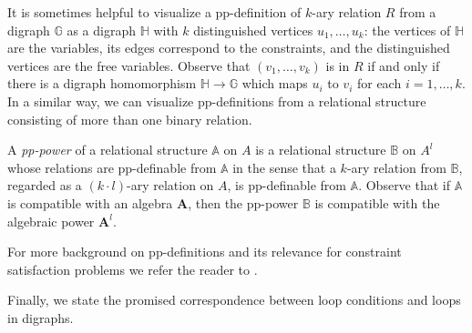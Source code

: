 \documentclass[a4paper]{article}
\newcommand{\alg}[1]{\mathbf{#1}}
\newcommand{\lc}[1]{#1}
\newcommand{\relstr}[1]{\mathbb{#1}}
\begin{document}
%
It is sometimes helpful to visualize a pp-definition of $k$-ary relation $R$ from a digraph $\relstr G$ as a digraph $\relstr{H}$ with $k$ distinguished vertices $u_1, \ldots, u_k$:
the vertices of $\relstr{H}$ are the variables, its edges correspond to the constraints, and the distinguished vertices are the free variables.
Observe that $(v_1, \ldots, v_k)$ is in $R$ if and only if there is a digraph homomorphism $\relstr{H} \to \relstr{G}$ which maps $u_i$ to $v_i$ for each $i = 1, \ldots, k$. In a similar way, we can visualize pp-definitions from a relational structure consisting of more than one binary relation. 

A \emph{pp-power} of a relational structure $\relstr A$ on $A$ is a relational structure $\relstr{B}$ on $A^l$ whose relations are pp-definable from $\relstr A$ in the sense that a $k$-ary relation from $\relstr{B}$, regarded as a $(k \cdot l)$-ary relation on $A$, is pp-definable from $\relstr A$. Observe that if $\relstr{A}$ is compatible with an algebra $\alg A$, then the pp-power $\relstr{B}$ is compatible with the algebraic power $\alg A^l$.


For more background on pp-definitions and its relevance for constraint satisfaction problems we refer the reader to \cite{PolSurvey}.

Finally, we state the promised correspondence between loop conditions and loops in digraphs.




\end{document}

